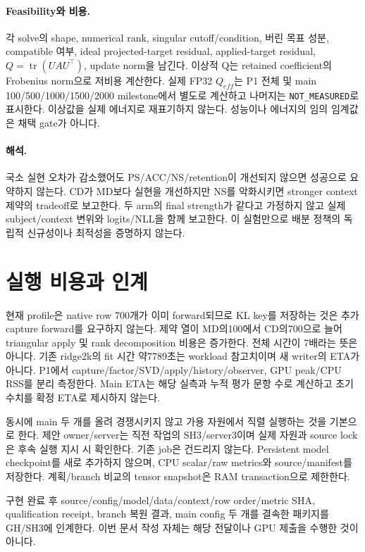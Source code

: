 \documentclass[11pt]{article}
\begin{document}
\paragraph{Feasibility와 비용.}
각 solve의 shape, numerical rank, singular cutoff/condition, 버린 목표 성분,
compatible 여부, ideal projected-target residual, applied-target residual,
\(Q=\operatorname{tr}(UAU^\top)\), update norm을 남긴다.
이상적 Q는 retained coefficient의 Frobenius norm으로 저비용 계산한다.
실제 FP32 $Q_{eff}$는 P1 전체 및 main 100/500/1000/1500/2000 milestone에서
별도로 계산하고 나머지는 \texttt{NOT\_MEASURED}로 표시한다. 이상값을 실제 에너지로
재표기하지 않는다. 성능이나 에너지의 임의 임계값은 채택 gate가 아니다.

\paragraph{해석.}
국소 실현 오차가 감소했어도 PS/ACC/NS/retention이 개선되지 않으면 성공으로
요약하지 않는다. CD가 MD보다 실현을 개선하지만 NS를 악화시키면 stronger context
제약의 tradeoff로 보고한다. 두 arm의 final strength가 같다고 가정하지 않고 실제
subject/context 변위와 logits/NLL을 함께 보고한다. 이 실험만으로 배분 정책의
독립적 신규성이나 최적성을 증명하지 않는다.

\section{실행 비용과 인계}
현재 profile은 native row 700개가 이미 forward되므로 KL key를 저장하는 것은
추가 capture forward를 요구하지 않는다. 제약 열이 MD의100에서 CD의700으로 늘어
triangular apply 및 rank decomposition 비용은 증가한다. 전체 시간이 7배라는 뜻은 아니다.
기존 ridge2k의 fit 시간 약7789초는 workload 참고치이며 새 writer의 ETA가 아니다.
P1에서 capture/factor/SVD/apply/history/observer, GPU peak/CPU RSS를 분리 측정한다.
Main ETA는 해당 실측과 누적 평가 문항 수로 계산하고 초기 수치를 확정 ETA로 제시하지 않는다.

동시에 main 두 개를 올려 경쟁시키지 않고 가용 자원에서 직렬 실행하는 것을 기본으로
한다. 제안 owner/server는 직전 작업의 SH3/server3이며 실제 자원과 source lock은
후속 실행 지시 시 확인한다. 기존 job은 건드리지 않는다. Persistent model checkpoint를
새로 추가하지 않으며, CPU scalar/raw metrics와 source/manifest를 저장한다.
계획/branch 비교의 tensor snapshot은 RAM transaction으로 제한한다.

구현 완료 후 source/config/model/data/context/row order/metric SHA, qualification
receipt, branch 복원 결과, main config 두 개를 결속한 패키지를 GH/SH3에 인계한다.
이번 문서 작성 자체는 해당 전달이나 GPU 제출을 수행한 것이 아니다.
\end{document}
